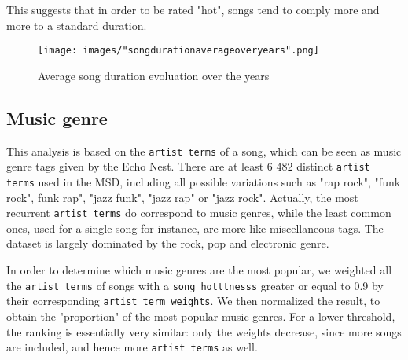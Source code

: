 \documentclass[11pt]{article}
\renewcommand\_{\textunderscore\allowbreak}
\begin{document}
This suggests that in order to be rated "hot", songs tend to comply more and more to a standard duration.

\begin{figure}[h!]
\centering
\captionsetup{width=1.0\textwidth}
\texttt{[image: images/"song\_duration\_average\_over\_years".png]}
\caption{Average song duration evoluation over the years}
\label{fig:song_duration_over_years}
\end{figure}

\subsection{Music genre}
This analysis is based on the \texttt{artist terms} of a song, which can be seen as music genre tags given by the Echo Nest.
There are at least 6 482 distinct \texttt{artist terms} used in the MSD, including all possible variations such as "rap rock", "funk rock", funk rap", "jazz funk", "jazz rap" or "jazz rock".
Actually, the most recurrent \texttt{artist terms} do correspond to music genres, while the least common ones, used for a single song for instance, are more like miscellaneous tags.
The dataset is largely dominated by the rock, pop and electronic genre.

In order to determine which music genres are the most popular, we weighted all the \texttt{artist terms} of songs with a \texttt{song hotttnesss} greater or equal to 0.9 by their corresponding \texttt{artist term weights}. 
We then normalized the result, to obtain the "proportion" of the most popular music genres.
For a lower threshold, the ranking is essentially very similar: only the weights decrease, since more songs are included, and hence more \texttt{artist terms} as well.

\end{document}
